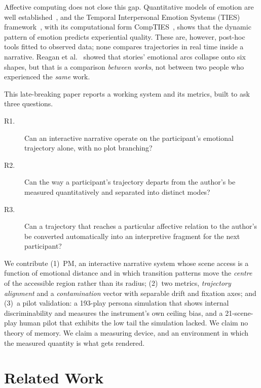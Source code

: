\documentclass[runningheads]{llncs}
\newcommand{\sysshort}{PM}
\begin{document}
Affective computing does not close this gap. Quantitative models of emotion are well established~\cite{russell1977,watson1988,warriner2013}, and the Temporal Interpersonal Emotion Systems (TIES) framework~\cite{butler2011,butler2017}, with its computational form CompTIES~\cite{butlercomp2017}, shows that the dynamic pattern of emotion predicts experiential quality. These are, however, post-hoc tools fitted to observed data; none compares trajectories in real time inside a narrative. Reagan et al.~\cite{reagan2016} showed that stories' emotional arcs collapse onto six shapes, but that is a comparison \emph{between works}, not between two people who experienced the \emph{same} work.

This late-breaking paper reports a working system and its metrics, built to ask three questions.
\begin{description}
  \item[R1.] Can an interactive narrative operate on the participant's emotional trajectory alone, with no plot branching?
  \item[R2.] Can the way a participant's trajectory departs from the author's be measured quantitatively and separated into distinct modes?
  \item[R3.] Can a trajectory that reaches a particular affective relation to the author's be converted automatically into an interpretive fragment for the next participant?
\end{description}

We contribute (1)~\sysshort, an interactive narrative system whose scene access is a function of emotional distance and in which transition patterns move the \emph{centre} of the accessible region rather than its radius; (2)~two metrics, \emph{trajectory alignment} and a \emph{contamination} vector with separable drift and fixation axes; and (3)~a pilot validation: a 193-play persona simulation that shows internal discriminability and measures the instrument's own ceiling bias, and a 21-scene-play human pilot that exhibits the low tail the simulation lacked. We claim no theory of memory. We claim a measuring device, and an environment in which the measured quantity is what gets rendered.

\section{Related Work}
\end{document}

